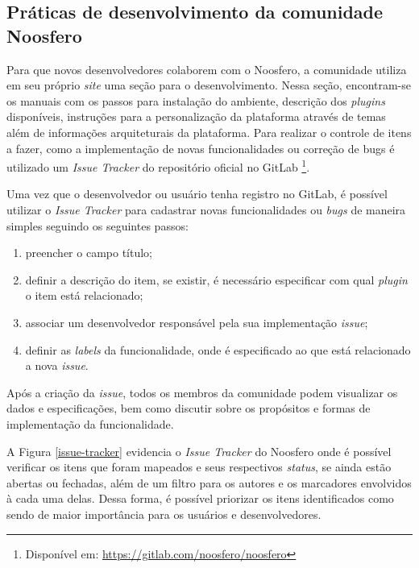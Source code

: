 \subsection{Práticas de desenvolvimento da comunidade Noosfero}
\label{proc-desenvol-comunidade}

Para que novos desenvolvedores colaborem com o Noosfero, a comunidade utiliza em seu próprio \textit{site} uma seção para o desenvolvimento. Nessa seção, encontram-se os manuais com os passos para instalação do ambiente, descrição dos \textit{plugins} disponíveis, instruções para a personalização da plataforma através de temas além de informações arquiteturais da plataforma. Para realizar o controle de itens a fazer, como a implementação de novas funcionalidades ou correção de bugs é utilizado um \textit{Issue Tracker} do repositório oficial no GitLab \footnote{Disponível em: \url{https://gitlab.com/noosfero/noosfero}}.

Uma vez que o desenvolvedor ou usuário tenha registro no GitLab, é possível utilizar o \textit{Issue Tracker} para cadastrar novas funcionalidades ou \textit{bugs} de maneira simples seguindo os seguintes passos:

\begin{enumerate}
\item preencher o campo título;
\item definir a descrição do item, se existir, é necessário especificar com qual \textit{plugin} o item está relacionado;
\item associar um desenvolvedor responsável pela sua implementação \textit{issue};
\item definir as \textit{labels} da funcionalidade, onde é especificado ao que está relacionado a nova \textit{issue}.
\end{enumerate}

Após a criação da \textit{issue}, todos os membros da comunidade podem visualizar os dados e especificações, bem como discutir sobre os propósitos e formas de implementação da funcionalidade.

A Figura \ref{issue-tracker} evidencia o \textit{Issue Tracker} do Noosfero onde é possível verificar os itens que foram mapeados e seus respectivos \textit{status}, se ainda estão abertas ou fechadas, além de um filtro para os autores e os marcadores envolvidos à cada uma delas. Dessa forma, é possível priorizar os itens identificados como sendo de maior importância para os usuários e desenvolvedores.

